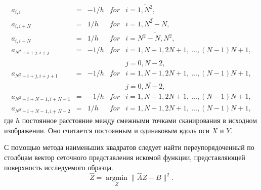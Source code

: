 \documentclass{beamer}
\begin{document}
\begin{frame}[c,allowframebreaks]
    \framebreak

    \small
    \begin{equation*}
        \begin{array}{lllll}
            a_{i,i}             & = &-1/h & for & i = \overline{1,N^2},                         \\
            a_{i,i+N}           & = &1/h  & for & i = \overline{1,N^2 - N},                     \\
            a_{i,i-N}           & = &1/h  & for & i = \overline{N^2 - N,N^2 },                  \\
            a_{N^2+i+j, i+j}    & = &-1/h & for & i = 1, N+1, 2N+1,~\dots, (N-1)N + 1,          \\
                                &   &       &   & j = \overline{0,N-2},                         \\
            a_{N^2+i+j, i+j+1}  & = &-1/h & for & i = 1, N+1, 2N+1,~\dots, (N-1)N + 1,          \\
                                &   &       &   & j = \overline{0,N-2},                         \\
            a_{N^2+i+N-1, i+N-1} &= &-1/h & for & i = 1, N+1, 2N+1,~\dots, (N-1)N + 1,          \\
            a_{N^2+i+N-1, i+N-2} &= &1/h  & for & i = 1, N+1, 2N+1,~\dots, (N-1)N + 1,
        \end{array}
    \end{equation*}
    где $h$ постоянное расстояние между смежными точками сканирования в исходном изображении.
    Оно считается постоянным и одинаковым вдоль оси $X$ и $Y$.
    \normalsize

    \framebreak

    С помощью метода наименьших квадратов следует найти переупорядоченный по столбцам вектор
    сеточного представления искомой функции, представляющей поверхность исследуемого образца.
    \begin{equation*}
        \hat{Z} = \operatorname{argmin}\limits_Z \|\hat{A} Z - B\|^2.
    \end{equation*}

\end{frame}

\end{document}
